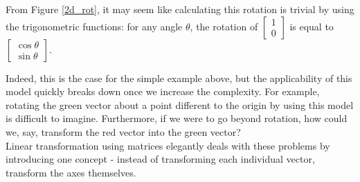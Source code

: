 \documentclass[12pt, a4paper]{article}
\begin{document}
From Figure \ref{2d_rot}, it may seem like calculating this rotation is trivial
by using the trigonometric functions: for any angle $\theta$, the rotation of
$\begin{bmatrix}1 \\ 0\end{bmatrix}$ is equal to $\begin{bmatrix}\cos\theta \\
        \sin\theta\end{bmatrix}$. \vspace{0.2cm}

Indeed, this is the case for the simple example above, but the applicability of
this model quickly breaks down once we increase the complexity. For example,
rotating the green vector about a point different to the origin by using this
model is difficult to imagine. Furthermore, if we were to go beyond rotation,
how could we, say, transform the red vector into the green vector? \\

Linear transformation using matrices elegantly deals with these problems by
introducing one concept - instead of transforming each individual vector,
transform the axes themselves. \\
\end{document}
